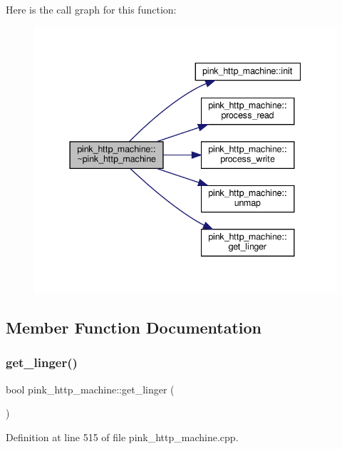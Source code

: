 Here is the call graph for this function\+:\nopagebreak
\begin{figure}[H]
\begin{center}
\leavevmode
\includegraphics[width=337pt]{classpink__http__machine_a38d1d6228955fc97c752d330d4c126c2_cgraph}
\end{center}
\end{figure}


\subsection{Member Function Documentation}
\mbox{\label{classpink__http__machine_a01dcf59a537c21d5a4a92c1c25fbf3ab}} 
\subsubsection{\texorpdfstring{get\+\_\+linger()}{get\_linger()}}
{\footnotesize\ttfamily bool pink\+\_\+http\+\_\+machine\+::get\+\_\+linger (\begin{DoxyParamCaption}{ }\end{DoxyParamCaption})}



Definition at line 515 of file pink\+\_\+http\+\_\+machine.\+cpp.

